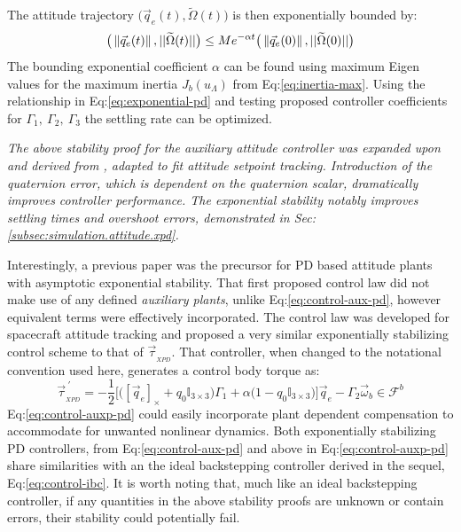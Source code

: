 The attitude trajectory $\big(\vec{q}_e(t),\widetilde{\Omega}(t)\big)$ is then exponentially bounded by:
\begin{equation}\label{eq:exponential-pd}
\big(\left\lVert\vec{q}_e(t)\right\rVert,||\widetilde{\Omega}(t)||\big)\leq Me^{-\alpha t}\big(\left\lVert\vec{q}_e(0)\right\rVert,||\widetilde{\Omega}(0)||\big)
\end{equation}
The bounding exponential coefficient $\alpha$ can be found using maximum Eigen values for the maximum inertia $J_b(u_{\Lambda})$ from Eq:\ref{eq:inertia-max}. Using the relationship in Eq:\ref{eq:exponential-pd} and testing proposed controller coefficients for $\Gamma_1,~\Gamma_2,~\Gamma_3$ the settling rate can be optimized.
\par
\emph{\color{Gray}The above stability proof for the auxiliary attitude controller was expanded upon and derived from \cite{attitudestabilization}, adapted to fit attitude setpoint tracking. Introduction of the quaternion error, which is dependent on the quaternion scalar, dramatically improves controller performance. The exponential stability notably improves settling times and overshoot errors, demonstrated in Sec:\ref{subsec:simulation.attitude.xpd}.}
\par
Interestingly, a previous paper \cite{robustattitude} was the precursor for PD based attitude plants with asymptotic exponential stability. That first proposed control law did not make use of any defined \emph{auxiliary plants}, unlike Eq:\ref{eq:control-aux-pd}, however equivalent terms were effectively incorporated. The control law was developed for spacecraft attitude tracking and proposed a very similar exponentially stabilizing control scheme to that of $\vec{\tau}_{_{XPD}}$. That controller, when changed to the notational convention used here, generates a control body torque as:
\begin{equation}\label{eq:control-auxp-pd}
\vec{\tau}^{\hspace{3pt}'}_{_{XPD}}=-\frac{1}{2}\Big[\big([\vec{q}_e]_\times+q_0\mathbb{I}_{3\times 3}\big)\Gamma_1+\alpha\big(1-q_0\mathbb{I}_{3\times 3}\big)\Big]\vec{q}_e-\Gamma_2\vec{\omega}_b\in\mathcal{F}^b
\end{equation} 
Eq:\ref{eq:control-auxp-pd} could easily incorporate plant dependent compensation to accommodate for unwanted nonlinear dynamics. Both exponentially stabilizing PD controllers, from Eq:\ref{eq:control-aux-pd} and above in Eq:\ref{eq:control-auxp-pd} share similarities with an the ideal backstepping controller derived in the sequel, Eq:\ref{eq:control-ibc}. It is worth noting that, much like an ideal backstepping controller, if any quantities in the above stability proofs are unknown or contain errors, their stability could potentially fail.
